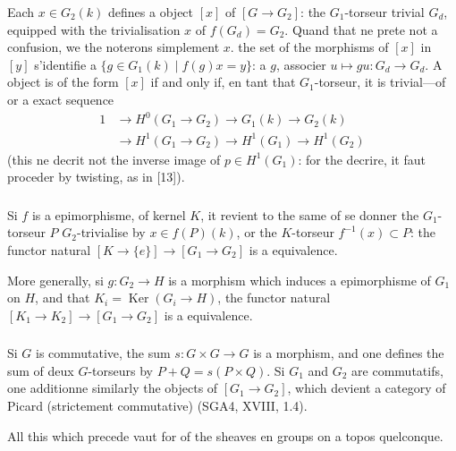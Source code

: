 \documentclass[12pt,a4paper]{article}
\theoremstyle{plain}
\theoremstyle{definition}
\theoremstyle{remark}
\DeclareMathOperator{\Ker}{Ker}
\begin{document}
Each $x \in G_2(k)$ defines a object $[x]$ of $[G \to G_2]$: the $G_1$-torseur trivial $G_d$, equipped with the trivialisation $x$ of $f(G_d) = G_2$. Quand that ne prete not a confusion, we the noterons simplement $x$. the set of the morphisms of $[x]$ in $[y]$ s'identifie a $\{g \in G_1(k) \mid f(g)x = y\}$: a $g$, associer $u \mapsto gu: G_d \to G_d$. A object is of the form $[x]$ if and only if, en tant that $G_1$-torseur, it is trivial---of or a exact sequence
\begin{equation}\label{eq:2.4.3.1}
\begin{split}
1 &\to H^0(G_1 \to G_2) \to G_1(k) \to G_2(k) \\
&\to H^1(G_1 \to G_2) \to H^1(G_1) \to H^1(G_2)
\end{split}
\end{equation}
(this ne decrit not the inverse image of $p \in H^1(G_1)$: for the decrire, it faut proceder by twisting, as in [13]).

\subsubsection{}

Si $f$ is a epimorphisme, of kernel $K$, it revient to the same of se donner the $G_1$-torseur $P$ $G_2$-trivialise by $x \in f(P)(k)$, or the $K$-torseur $f^{-1}(x) \subset P$: the functor natural $[K \to \{e\}] \to [G_1 \to G_2]$ is a equivalence.

More generally, si $g:G_2 \to H$ is a morphism which induces a epimorphisme of $G_1$ on $H$, and that $K_i = \Ker(G_i \to H)$, the functor natural $[K_1 \to K_2] \to [G_1 \to G_2]$ is a equivalence.

\subsubsection{}

Si $G$ is commutative, the sum $s: G \times G \to G$ is a morphism, and one defines the sum of deux $G$-torseurs by $P + Q = s(P \times Q)$. Si $G_1$ and $G_2$ are commutatifs, one additionne similarly the objects of $[G_1 \to G_2]$, which devient a category of Picard (strictement commutative) (SGA4, XVIII, 1.4).

All this which precede vaut for of the sheaves en groups on a topos quelconque.

\subsubsection{}
\end{document}
